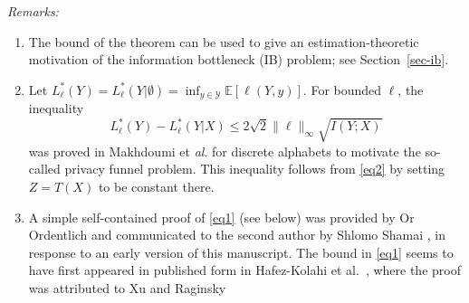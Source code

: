 \documentclass[11pt]{article}
\def\Y{\mathcal{Y}}
\def\EXP {{\mathbb E}}
\begin{document}
\noindent \emph{Remarks:} 
\vspace{-3pt}

\begin{enumerate}[label=(\roman*)] 
\item The bound of the theorem  can be used to
give an estimation-theoretic motivation of the information bottleneck (IB)
problem; see Section~\ref{sec-ib}.   
\item   Let $L_\ell^*(Y)= L_\ell^*(Y|\emptyset)= \inf_{y\in \Y}
\EXP[\ell(Y,y)] $. For bounded $\ell$, the inequality
\[
 L_\ell^*(Y)- L_\ell^*(Y|X)   \le 2\sqrt{2} \|\ell\|_{\infty}  \sqrt{I(Y;X) } 
\]
was proved in  Makhdoumi et \emph{al$.$} \cite[Theorem~1]{Mak-etal14}  for discrete
alphabets to motivate the so-called privacy funnel problem. This
inequality follows from \eqref{eq2} by setting $Z=T(X)$ to be constant there. 

\item A simple self-contained proof of   \eqref{eq1}  (see below) was provided by Or Ordentlich and communicated to the second author by Shlomo Shamai \cite{OrSh20}, in response to an early version of this manuscript.  
The bound in \eqref{eq1} seems to have first appeared in published form in  Hafez-Kolahi et al.\ \cite[Lemma~1]{HaMoKaBa21}, where the proof was attributed to Xu and Raginsky \cite{XuRa20}



\end{enumerate}  
\end{document}
